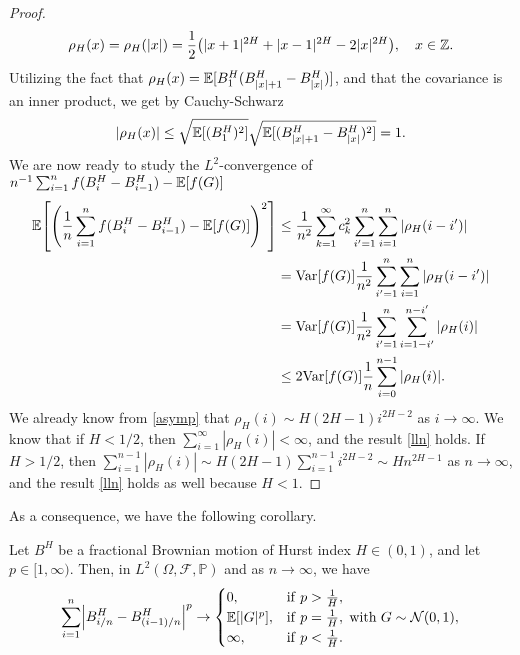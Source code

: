 \begin{proof}
\begin{equation}
    \rho_{H}(x)=\rho_{H}(|x|)=\frac{1}{2}\left(|x+1|^{2H}+|x-1|^{2H}-2|x|^{2H}\right), \quad x\in \Z. 
\end{equation}
Utilizing the fact that $\rho_{H}(x)=\mathbb{E}[B_{1}^{H}(B_{|x|+1}^{H}-B_{|x|}^{H})]$, and that the covariance is an inner product, we get by Cauchy-Schwarz
\begin{align}
     |\rho_{H}(x)|\leq \sqrt{\mathbb{E}[(B_{1}^{H})^{2}]}\sqrt{\mathbb{E}[(B_{|x|+1}^{H}-B_{|x|}^{H})^{2}]}=1.
\end{align}
We are now ready to study the $L^2$-convergence of $n^{-1}\sum_{i=1}^{n}f(B_{i}^{H}-B_{i-1}^{H})-\mathbb{E}[f(G)]$
\begin{align}
    \E\left[\left(\frac{1}{n}\sum_{i=1}^{n}f(B_{i}^{H}-B_{i-1}^{H})-\E[f(G)]\right)^{2}\right] &\leq \frac{1}{n^{2}}\sum_{k=1}^{\infty}c_{k}^{2}\sum_{i'=1}^{n}\sum_{i =1}^{n}|\rho_{H}(i-i')|\\
    &= \mathrm{Var}[f(G)]\frac{1}{n^2}\sum_{i'=1}^{n}\sum_{i =1}^{n}|\rho_{H}(i-i')|\\
    &= \mathrm{Var}[f(G)]\frac{1}{n^2}\sum_{i'=1}^{n}\sum_{i=1-i'}^{n-i'}|\rho_{H}(i)|\\
    &\leq 2\mathrm{Var}[f(G)]\frac{1}{n}\sum_{i=0}^{n-1}|\rho_{H}(i)|.
\end{align}
We already know from \eqref{asymp} that $\rho_{H}(i)\sim H(2H-1)i^{2H-2}$ as $i\to \infty$. We know that if $H<1/2$, then $\sum_{i=1}^{\infty}|\rho_{H}(i)|<\infty$, and the result \eqref{lln} holds. If $H>1/2$, then $\sum_{i=1}^{n-1}|\rho_{H}(i)|\sim H(2H-1)\sum_{i=1}^{n-1}i^{2H-2}\sim Hn^{2H-1}$ as $n\to \infty$, and the result \eqref{lln} holds as well because $H<1$.
\end{proof}
As a consequence, we have the following corollary.
\begin{cor}\label{pvariations}
    Let $B^H$ be a fractional Brownian motion of Hurst index $H\in (0,1)$, and let $p\in [1,\infty)$. Then, in $L^{2}(\Omega,\mathcal{F},\mathbb{P})$ and as $n\to\infty$, we have
    \begin{equation}
        \sum_{i=1}^{n}\left|B_{i/n}^{H}-B_{(i-1)/n}^{H}\right|^{p}\to \begin{cases}
            0, & \mathrm{if} \hspace{3 pt}p>\frac{1}{H},\\
            \E[|G|^{p}], & \mathrm{if}\hspace{3 pt}p=\frac{1}{H},\hspace{3 pt} \mathrm{with}\hspace{3 pt} G\sim \mathcal{N}(0,1),\\
            \infty, & \mathrm{if}\hspace{3 pt}p<\frac{1}{H}.
        \end{cases}
    \end{equation}
\end{cor}
